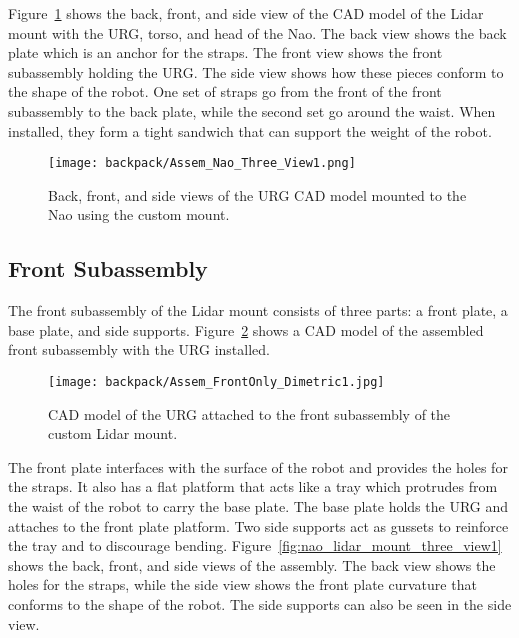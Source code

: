 Figure~\ref{fig:nao_lidar_mount_nao_three_view1} shows the back, front, and
side view of the CAD model of the Lidar mount with the URG, torso, and head of the
Nao. The back view shows the back plate which is an anchor for the straps.
The front view shows the front subassembly holding the URG\@. The side view
shows how these pieces conform to the shape of the robot. One set of straps
go from the front of the front subassembly to the back plate, while the second set
go around the waist. When installed, they form a tight sandwich that can support
the weight of the robot.

\begin{figure}
\centering
\texttt{[image: backpack/Assem\_Nao\_Three\_View1.png]}
\caption{Back, front, and side views of the URG CAD model 
         mounted to the Nao using the custom mount.}
\label{fig:nao_lidar_mount_nao_three_view1}
\end{figure}

\FloatBarrier

\subsection{Front Subassembly}
The front subassembly of the Lidar mount consists of three parts: a front plate,
a base plate, and side supports. Figure~\ref{fig:nao_lidar_mount_dimetric1}
shows a CAD model of the assembled front subassembly with the URG installed.

\begin{figure}[H]
\centering
\texttt{[image: backpack/Assem\_FrontOnly\_Dimetric1.jpg]}
\caption{CAD model of the URG attached to the front subassembly
         of the custom Lidar mount.}
\label{fig:nao_lidar_mount_dimetric1}
\end{figure}

The front plate interfaces with the surface of the robot and provides the
holes for the straps. It also has a flat platform that acts like a tray which protrudes from the
waist of the robot to carry the base plate. The base plate holds the URG
and attaches to the front plate platform. Two side supports act as gussets
to reinforce the tray and to discourage bending.
Figure~\ref{fig:nao_lidar_mount_three_view1} shows the back, front, and side
views of the assembly. The back view shows the holes for the straps, 
while the side view shows the front plate curvature that conforms
to the shape of the robot. The side supports can also be seen in the side view.

